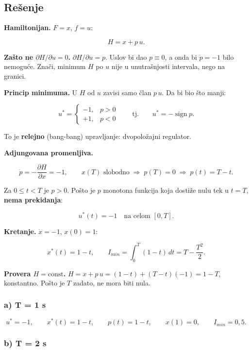 \documentclass[11pt,a4paper,parskip=half,headsepline,numbers=noenddot]{scrartcl}
\begin{document}
\subsection{Rešenje}

\textbf{Hamiltonijan.} \(F = x\), \(f = u\):

\[H = x + p\,u .\]

\textbf{Zašto ne \(\partial H/\partial u = 0\).} \(\partial H/\partial u = p\). Uslov bi dao \(p \equiv 0\), a onda bi \(\dot p = -1\) bilo nemoguće. Znači, minimum \(H\) po \(u\) nije u unutrašnjosti intervala, nego na granici.

\textbf{Princip minimuma.} U \(H\) od \(u\) zavisi samo član \(p\,u\). Da bi bio što manji:

\[u^* = \begin{cases} -1, & p > 0 \\ +1, & p < 0 \end{cases} \qquad\text{tj.}\qquad u^* = -\operatorname{sign} p .\]

To je \textbf{relejno} (bang-bang) upravljanje: dvopoložajni regulator.

\textbf{Adjungovana promenljiva.}

\[\dot p = -\frac{\partial H}{\partial x} = -1, \qquad x(T) \text{ slobodno} \;\Rightarrow\; p(T) = 0 \;\Rightarrow\; p(t) = T - t .\]

Za \(0 \le t < T\) je \(p > 0\). Pošto je \(p\) monotona funkcija koja dostiže nulu tek u \(t = T\), \textbf{nema prekidanja}:

\[u^*(t) = -1 \quad\text{na celom } [0, T] .\]

\textbf{Kretanje.} \(\dot x = -1\), \(x(0) = 1\):

\[x^*(t) = 1 - t, \qquad I_{min} = \int_0^T(1 - t)\,dt = T - \frac{T^2}{2} .\]

\textbf{Provera \(H = \text{const}\).} \(H = x + p\,u = (1 - t) + (T - t)(-1) = 1 - T\), konstantno. Pošto je \(T\) zadato, ne mora biti nula.

\subsubsection{a) T = 1 s}

\[u^* = -1, \qquad x^*(t) = 1 - t, \qquad p(t) = 1 - t, \qquad x(1) = 0, \qquad I_{min} = 0{,}5 .\]

\subsubsection{b) T = 2 s}
\end{document}
